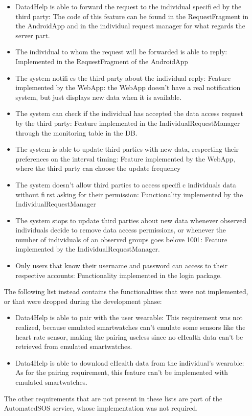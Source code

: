 \begin{itemize}
\item Data4Help is able to forward the request to the individual specified by
the third party: The code of this feature can be found in the RequestFragment in the AndroidApp and in the individual request manager for what regards the server part.
\item The individual to whom the request will be forwarded is able to reply: Implemented in the RequestFragment of the AndroidApp
\item The system notifies the third party about the individual reply: Feature implemented by the WebApp: the WebApp doesn't have a real notification system, but just displays new data when it is available.
\item The system can check if the individual has accepted the data access
request by the third party: Feature implemented in the IndividualRequestManager through the monitoring table in the DB.
\item The system is able to update third parties with new data, respecting their
preferences on the interval timing: Feature implemented by the WebApp, where the third party can choose the update frequency
\item The system doesn't allow third parties to access specific individuals data
without first asking for their permission: Functionality implemented by the IndividualRequestManager
\item The system stops to update third parties about new data whenever observed individuals decide to remove data access permissions, or whenever the
number of individuals of an observed groups goes belove 1001: Feature implemented by the IndividualRequestManager.
\item Only users that know their username and password can access to their
respective accounts: Functionality implemented in the login package.
\end{itemize}


The following list instead contains the functionalities that were not implemented, or that were dropped during the development phase:

\begin{itemize}
\item Data4Help is able to pair with the user wearable: This requirement was not realized, because emulated smartwatches can't emulate some sensors like the heart rate sensor, making the pairing useless since no eHealth data can't be retrieved from emulated smartwatches.
\item Data4Help is able to download eHealth data from the individual's wearable: As for the pairing requirement, this feature can't be implemented with emulated smartwatches.
\end{itemize}


The other requirements that are not present in these lists are part of the AutomatedSOS service, whose implementation was not required.